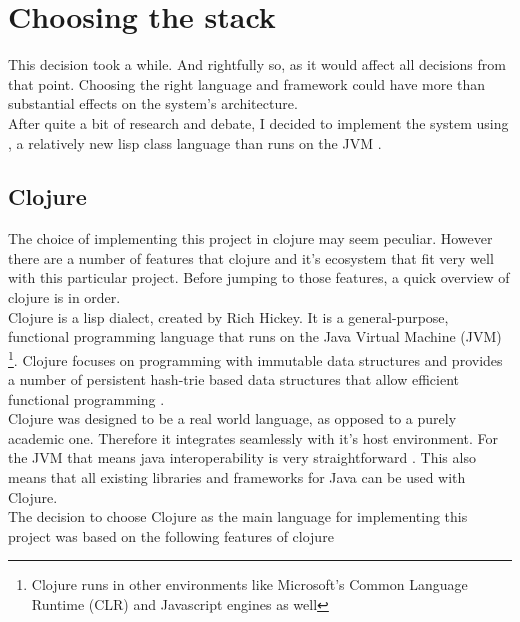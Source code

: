 
\chapter{Choosing the stack} %

\label{ch:stack} %

This decision took a while. And rightfully so, as it would affect all decisions from that point. Choosing the right language and framework could have more than substantial effects on the system's architecture.\\

After quite a bit of research and debate, I decided to implement the system using , a relatively new lisp class language than runs on the JVM \citep{clojure:features}.

\section{Clojure}

The choice of implementing this project in clojure may seem peculiar. However there are a number of features that clojure and it's ecosystem that fit very well with this particular project. Before jumping to those features, a quick overview of clojure is in order.\\

Clojure is a lisp dialect, created by Rich Hickey. It is a general-purpose, functional programming language that runs on the Java Virtual Machine (JVM) \footnote{Clojure runs in other environments like Microsoft's Common Language Runtime (CLR) and Javascript engines as well}. Clojure focuses on programming with immutable data structures and provides a number of persistent hash-trie based data structures that allow efficient functional programming \citep{clojure:ds}.\\

Clojure was designed to be a real world language, as opposed to a purely academic one. Therefore it integrates seamlessly with it's host environment. For the JVM that means java interoperability is very straightforward \citep{clojure:interop}. This also means that all existing libraries and frameworks for Java can be used with Clojure.\\

The decision to choose Clojure as the main language for implementing this project was based on the
following features of clojure

